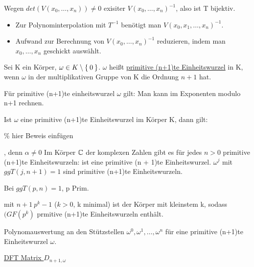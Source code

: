\documentclass{../tudscript}
\begin{document}
Wegen $det(V(x_0, \ldots, x_n)) \neq 0$ exisiter $V(x_0, \ldots, x_n)^{-1}$, also ist T bijektiv.

\begin{itemize}
\item Zur Polynominterpolation mit $T^{-1}$ benötigt man $V(x_0, x_1, \ldots, x_n)^{-1}$.
\item Aufwand zur Berechnung von $V(x_0, \ldots, x_n)^{-1}$ reduzieren, indem man $x_0, \ldots, x_n$ geschickt auswählt.
\end{itemize}
Sei K ein Körper, $\omega \in K \setminus \Set{0}$. $\omega$ heißt \underline{primitive (n+1)te Einheitswurzel} in K, wenn $\omega$ in der multiplikativen Gruppe von K die Ordnung $n + 1$ hat.

Für primitive (n+1)te einheitswurzel $\omega$ gilt:
Man kann im Exponenten modulo n+1 rechnen.

Ist $\omega$ eine primitive (n+1)te Einheitswurzel im Körper K, dann gilt:

\% hier Beweis einfügen

, denn $\alpha \neq 0$
Im Körper $\mathbb{C}$ der komplexen Zahlen gibt es für jedes $n > 0$ primitive (n+1)te Einheitswurzeln:
ist eine primitive (n + 1)te Einheitswurzel.
$\omega^j$ mit $ggT(j, n + 1) = 1$ sind primitive (n+1)te Einheitswurzeln.

Bei $ggT(p, n) = 1$, p Prim.

 mit $n+1\ p^k -1$ ($k > 0$, k minimal) ist der Körper mit kleinstem k, sodass $(GF(p^k)$ prmitive (n+1)te Einheitswurzeln enthält.

Polynomauswertung an den Stützstellen $\omega^0, \omega^1, \ldots, \omega^n$ für eine primitive (n+1)te Einheitswurzel $\omega$.

\underline{DFT Matrix $D_{n+1, \omega}$}

\end{document}
